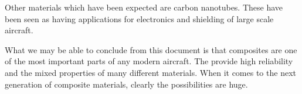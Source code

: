 \documentclass[letterpaper]{article}
\begin{document}
\begin{multicols}{2}
	Other materials which have been expected are carbon nanotubes. These have been seen as having applications for electronics and shielding of large scale aircraft.

	What we may be able to conclude from this document is that composites are one of the most important parts of any modern aircraft. The provide high reliability and the mixed properties of many different materials. When it comes to the next generation of composite materials, clearly the possibilities are huge.
\end{multicols}
\renewcommand\refname{REFERENCES}
\printbibliography
\end{document}
